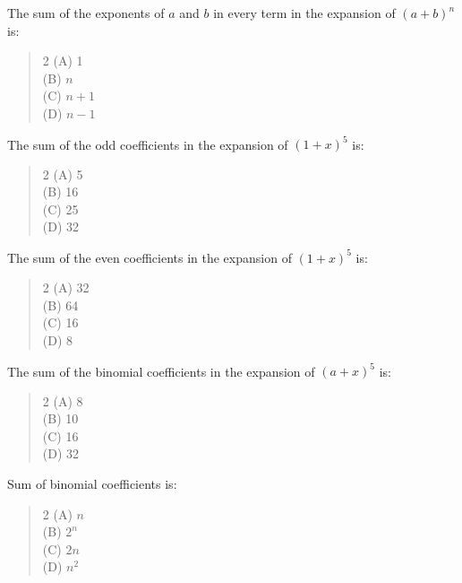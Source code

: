 \documentclass[11pt,a4paper]{article}
\begin{document}
\begin{mcqlist}
\item The sum of the exponents of $a$ and $b$ in every term in the expansion of $(a+b)^n$ is:
\begin{quote}\begin{multicols}{2}
\noindent (A) 1 \\
(B) $n$ \\
(C) $n+1$ \\
(D) $n-1$
\end{multicols}\end{quote}

\item The sum of the odd coefficients in the expansion of $(1+x)^5$ is:
\begin{quote}\begin{multicols}{2}
\noindent (A) 5 \\
(B) 16 \\
(C) 25 \\
(D) 32
\end{multicols}\end{quote}

\item The sum of the even coefficients in the expansion of $(1+x)^5$ is:
\begin{quote}\begin{multicols}{2}
\noindent (A) 32 \\
(B) 64 \\
(C) 16 \\
(D) 8
\end{multicols}\end{quote}

\item The sum of the binomial coefficients in the expansion of $(a+x)^5$ is:
\begin{quote}\begin{multicols}{2}
\noindent (A) 8 \\
(B) 10 \\
(C) 16 \\
(D) 32
\end{multicols}\end{quote}

\item Sum of binomial coefficients is:
\begin{quote}\begin{multicols}{2}
\noindent (A) $n$ \\
(B) $2^n$ \\
(C) $2n$ \\
(D) $n^2$
\end{multicols}\end{quote}


\end{mcqlist}
\end{document}
